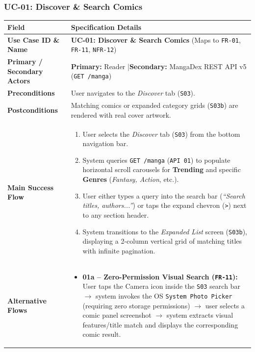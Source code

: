\subsubsection{UC-01: Discover \& Search Comics}
\begin{table}[H]
\footnotesize
\renewcommand{\arraystretch}{1.22}
\begin{tabularx}{\textwidth}{L{3.2cm} Y}
\toprule
{}
\textbf{Field} & \textbf{Specification Details} \\
\midrule
\textbf{Use Case ID \& Name} & \textbf{UC-01: Discover \& Search Comics} (Maps to \texttt{FR-01}, \texttt{FR-11}, \texttt{NFR-12}) \\
\textbf{Primary / Secondary Actors} & \textbf{Primary:} Reader \quad|\quad \textbf{Secondary:} MangaDex REST API v5 (\texttt{GET /manga}) \\
\textbf{Preconditions} & User navigates to the \textit{Discover} tab (\texttt{S03}). \\
\textbf{Postconditions} & Matching comics or expanded category grids (\texttt{S03b}) are rendered with real cover artwork. \\
\textbf{Main Success Flow} &
\begin{enumerate}[nosep,leftmargin=1.4em]
    \item User selects the \textit{Discover} tab (\texttt{S03}) from the bottom navigation bar.
    \item System queries \texttt{GET /manga} (\texttt{API 01}) to populate horizontal scroll carousels for \textbf{Trending} and specific \textbf{Genres} (\textit{Fantasy, Action}, etc.).
    \item User either types a query into the search bar (\textit{``Search titles, authors...''}) or taps the expand chevron (\texttt{>}) next to any section header.
    \item System transitions to the \textit{Expanded List} screen (\texttt{S03b}), displaying a 2-column vertical grid of matching titles with infinite pagination.
\end{enumerate} \\
\textbf{Alternative Flows} &
\begin{itemize}[nosep,leftmargin=1.4em]
    \item \textbf{01a -- Zero-Permission Visual Search (\texttt{FR-11}):} User taps the Camera icon inside the \texttt{S03} search bar $\to$ system invokes the OS \texttt{System Photo Picker} (requiring zero storage permissions) $\to$ user selects a comic panel screenshot $\to$ system extracts visual features/title match and displays the corresponding comic result.

\end{itemize}
\end{tabularx}
\end{table}
